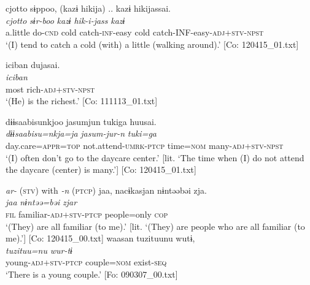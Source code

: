 \ex \label{ex:9.46c} %
    \glll  {\textbar}cjotto{\textbar}  sɨppoo,  (kazɨ  hikija)  ..  kazɨ  hikijassai.\\
      \textit{cjotto}  \textit{sɨr-boo}  \textit{kazɨ}  \textit{hik-i-jass}  {}  \textit{kazɨ} \textit{}\\
      a.little  do-\textsc{cnd}  cold  catch-\textsc{inf}-easy  {}  cold  catch-INF-easy-\textsc{adj}+\textsc{stv}-\textsc{npst}\\
      \glt       ‘(I) tend to catch a cold (with) a little (walking around).’ [Co: 120415\_01.txt]

\ex \label{ex:9.46d} %
 \glll  {\textbar}iciban{\textbar}  dujasai.\\
      \textit{iciban}  \textit{}\\
      most  rich-\textsc{adj}+\textsc{stv}-\textsc{npst}\\
      \glt       ‘(He) is the richest.’ [Co: 111113\_01.txt]

\ex \label{ex:9.46e} %
\glll {\textbar}dɨɨsaabisu{\textbar}nkjoo  jasumjun  tukiga  huusai.\\
      \textit{dɨɨsaabisu=nkja=ja}  \textit{jasum-jur-n}  \textit{tuki=ga}  \textit{}\\
      day.care=\textsc{appr}=\textsc{top}  not.attend-\textsc{umrk}-\textsc{ptcp}  time=\textsc{nom}   many-\textsc{adj}+\textsc{stv}-\textsc{npst}\\
      \glt ‘(I) often don’t go to the daycare center.’ [lit. ‘The time when (I) do not attend the daycare (center) is many.’]    [Co: 120415\_01.txt]

\exi{} \textit{ar-} (\textsc{stv}) with \textit{{}-n} (\textsc{ptcp})
\ex\label{ex:9.46f} %
  \glll  jaa,  nacɨkasjan  nɨntəəbəi  zja.\\
      \textit{jaa}  \textit{}  \textit{nɨntəə=bəi}  \textit{zjar}\\
      \textsc{fil}  familiar-\textsc{adj}+\textsc{stv}-\textsc{ptcp}  people=only  \textsc{cop}\\
      \glt       ‘(They) are all familiar (to me).’ [lit. ‘(They) are people who are all familiar (to me).’] [Co: 120415\_00.txt]
\ex\label{ex:9.46g}%
\glll  waasan  tuzituunu  wutɨ,\\
      \textit{}  \textit{tuzituu=nu}  \textit{wur-tɨ}\\
      young-\textsc{adj}+\textsc{stv}-\textsc{ptcp}  couple=\textsc{nom}  exist-\textsc{seq}\\
      \glt       ‘There is a young couple.’ [Fo: 090307\_00.txt]

